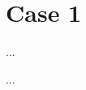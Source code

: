 %
%
%
%

\chapter*{Case 1}
\label{chap:case1}


\begin{lemma}
  \label{lmm:cube_of_castHom_ne_zero}
  \leanok
  ...
\end{lemma}


\begin{lemma}
    \label{lmm:cube_of_not_dvd}
    \leanok
    ...
  \end{lemma}


